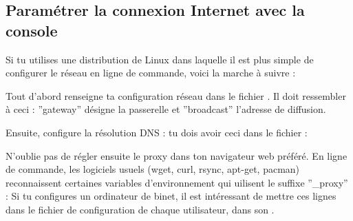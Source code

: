 \subsection{Param\'etrer la connexion Internet avec la console}
\label{linux_cmdline}
Si tu utilises une distribution de Linux dans laquelle il est plus simple de configurer le r\'eseau en ligne de commande, voici la marche \`a suivre :

Tout d'abord renseigne ta configuration r\'eseau dans le fichier . Il doit ressembler \`a ceci :
\noindent {}
''gateway'' d\'esigne la passerelle et ''broadcast'' l'adresse de diffusion.
\newline

Ensuite, configure la r\'esolution DNS : tu dois avoir ceci dans le fichier  :
\noindent {}

N'oublie pas de r\'egler ensuite le proxy dans ton navigateur web pr\'ef\'er\'e.
En ligne de commande, les logiciels usuels (wget, curl, rsync, apt-get, pacman) reconnaissent certaines variables d'environnement qui uilisent le suffixe ''\_proxy'' :
\noindent {}
Si tu configures un ordinateur de binet, il est intéressant de mettre ces lignes dans le fichier de configuration de chaque utilisateur, dans son .